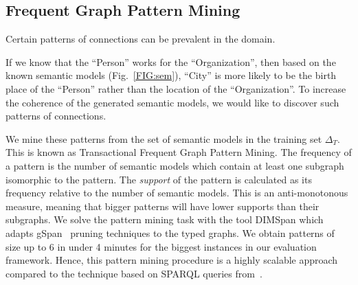 \documentclass[letterpaper]{article} %
\newcommand{\authornote}[3]{
  {\fbox{\sc 
  #1}:$\blacktriangleright$\textcolor{#2}{\small{#3}}$\blacktriangleleft$}%
}
\newcommand{\ddg}[1]{\authornote{DDG}{blue}{#1}}
\newcommand{\npr}[1]{\authornote{NPR}{orange}{#1}}
\newcommand{\forijcai}[1]{}
\begin{document}
\subsection{Frequent Graph Pattern Mining \label{SSEC:pattern-mining}}

Certain patterns of connections can be prevalent in the domain.
\forijcai{
For example, in Fig.~\ref{FIG:sem} both semantic models have class nodes ``City'', ``Organization'' and ``Person''.
According to the ontology in Fig.~\ref{FIG:onto} there are multiple ways to connect these nodes.
}
If we know that the ``Person'' works for the ``Organization'', then based on the known semantic models (Fig.~\ref{FIG:sem}), ``City'' is more likely to be the birth place of the ``Person'' rather than the location of the ``Organization''.
To increase the coherence of the generated semantic models, we would like to discover such patterns of connections.


We mine these patterns from the set of semantic models in the training set $\Delta_T$.
This is known as Transactional Frequent Graph Pattern Mining\forijcai{, which
includes the subgraph isomorphism problem, known to be NP-complete}.
The frequency of a pattern is the number of semantic models 
which contain
at least one subgraph isomorphic to the pattern.
The \emph{support} of the pattern is calculated as its 
frequency relative to the number of semantic models.
This is an anti-monotonous measure, meaning that bigger 
patterns will have lower supports than their subgraphs.
We solve the pattern mining task with the tool DIMSpan \cite{petermann2017dimspan} which adapts gSpan~\cite{yan2002gspan} pruning techniques to the typed graphs.\forijcai{and uses Apache Flink for scalability.}  
We obtain patterns of size up to 6 in under 4 minutes for the biggest instances 
in our evaluation framework.
Hence, this pattern mining procedure is a highly 
scalable approach compared to the technique based on SPARQL queries 
from~\cite{Taheriyan:Leveraging}.
\end{document}
